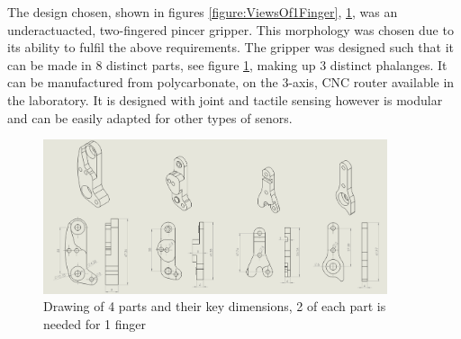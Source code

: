 The design chosen, shown in figures \ref{figure:ViewsOf1Finger}, \ref{fig:dimensions}, was an underactuacted, two-fingered pincer gripper. This morphology was chosen due to its ability to fulfil the above requirements. The gripper was designed such that it can be made in 8 distinct parts, see figure \ref{fig:dimensions}, making up 3 distinct phalanges. It can be manufactured from polycarbonate, on the 3-axis, CNC router available in the laboratory. It is designed with joint and tactile sensing however is modular and can be easily adapted for other types of senors. 

\begin{figure}
    \centering
    \includegraphics[width=0.9\textwidth]{Images/GripperDesign/dimensions.PNG}
    \caption{Drawing of 4 parts and their key dimensions, 2 of each part is needed for 1 finger}
    \label{fig:dimensions}
\end{figure}


